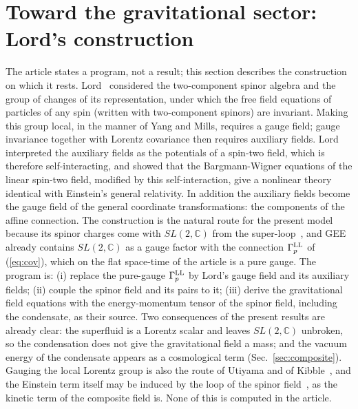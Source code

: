 \documentclass[aps,prd,onecolumn,superscriptaddress,nofootinbib,floatfix,longbibliography]{revtex4-2}
\newcommand{\LL}{{\rm LL}}
\begin{document}
\section{Toward the gravitational sector: Lord's construction}
\label{sec:gravity}

The article states a program, not a result; this section describes the construction on which it rests. Lord~\cite{Lord1971} considered
the two-component spinor algebra and the group of changes of its representation, under which the free field equations of particles of
any spin (written with two-component spinors) are invariant. Making this group local, in the manner of Yang and Mills, requires a gauge
field; gauge invariance together with Lorentz covariance then requires auxiliary fields. Lord interpreted the auxiliary fields as the
potentials of a spin-two field, which is therefore self-interacting, and showed that the Bargmann-Wigner equations of the linear spin-two
field, modified by this self-interaction, give a nonlinear theory identical with Einstein's general relativity. In addition the auxiliary
fields become the gauge field of the general coordinate transformations: the components of the affine connection. The construction is the
natural route for the present model because its spinor charges come with $SL(2,\mathbb C)$ from the super-loop~\cite{Nash2026}, and GEE
already contains $SL(2,\mathbb C)$ as a gauge factor with the connection $\Gamma^\LL_p$ of (\ref{eq:cov}), which on the flat space-time of
the article is a pure gauge. The program is: (i) replace the pure-gauge $\Gamma^\LL_p$ by Lord's gauge field and its auxiliary fields;
(ii) couple the spinor field and its pairs to it; (iii) derive the gravitational field equations with the energy-momentum tensor of the
spinor field, including the condensate, as their source. Two consequences of the present results are already clear: the superfluid is a
Lorentz scalar and leaves $SL(2,\mathbb C)$ unbroken, so the condensation does not give the gravitational field a mass; and the vacuum
energy of the condensate appears as a cosmological term (Sec.~\ref{sec:composite}). Gauging the local Lorentz group is also the route of
Utiyama and of Kibble~\cite{Utiyama1956,Kibble1961,Hehl1976}, and the Einstein term itself may be induced by the loop of the spinor
field~\cite{Sakharov1967,Visser2002}, as the kinetic term of the composite field is. None of this is computed in the article.
\end{document}

